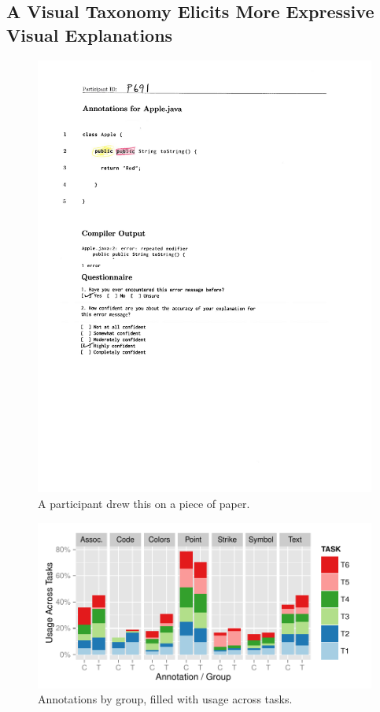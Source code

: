 \documentclass[conference]{IEEEtran}
\begin{document}
\subsection{A Visual Taxonomy Elicits More Expressive Visual Explanations}



\begin{figure}[!t]
\centering
\includegraphics[width=\columnwidth]{apple_exp}
\caption{A participant drew this on a piece of paper.\label{fig_sim}}
\end{figure}


\begin{figure}[!t]
\centering
\includegraphics[width=\columnwidth]{annotation_by_group}
\caption{Annotations by group, filled with usage across tasks.}\label{fig:annotationbygroup}
\end{figure}
\end{document}
